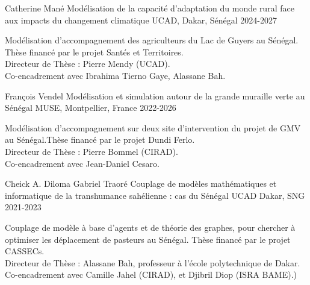 \begin{cventries}
    \cventry
      {Catherine Mané} %
      {Modélisation de la capacité d’adaptation du monde rural face
      aux impacts du changement climatique} %
      {UCAD, Dakar, Sénégal} %
      {2024-2027} %
      {
        \begin{cvitems} %
          Modélisation d'accompagnement des agriculteurs du Lac de Guyers au Sénégal. Thèse financé par le projet Santés et Territoires.\\
          Directeur de Thèse : Pierre Mendy (UCAD).\\
          Co-encadrement avec Ibrahima Tierno Gaye, Alassane Bah.
        \end{cvitems}
      }
    \cventry
      {François Vendel} %
      {Modélisation et simulation autour de la grande muraille verte au Sénégal} %
      {MUSE, Montpellier, France} %
      {2022-2026} %
      {
        \begin{cvitems} %
          Modélisation d'accompagnement sur deux site d'intervention du projet de GMV au Sénégal.Thèse financé par le projet Dundi Ferlo.\\
          Directeur de Thèse : Pierre Bommel (CIRAD).\\
          Co-encadrement avec Jean-Daniel Cesaro.
        \end{cvitems}
      }
    \cventry
      {Cheick A. Diloma Gabriel Traoré} %
      {Couplage de modèles mathématiques et informatique de la transhumance sahélienne : cas du Sénégal} %
      {UCAD Dakar, SNG} %
      {2021-2023} %
      {
        \begin{cvitems} %
          Couplage de modèle à base d'agents et de théorie des graphes, pour chercher à optimiser les déplacement de pasteurs au Sénégal. Thèse financé par le projet CASSECs.\\
          Directeur de Thèse : Alassane Bah, professeur à l'école polytechnique de Dakar.\\
          Co-encadrement avec Camille Jahel (CIRAD), et Djibril Diop (ISRA BAME).)
        \end{cvitems}
      }
  

\end{cventries}
